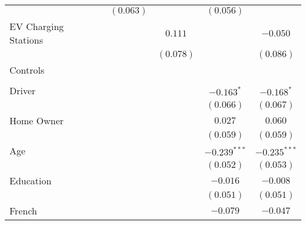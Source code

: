 \begin{center}
\begin{tiny}
\begin{longtable}{l@{} c@{} c@{} c@{} c@{} c@{}}
                                                      &                 & $(0.063)$        &                 & $(0.056)$        &                  \\
\quad EV Charging Stations                            &                 &                  & $0.111$         &                  & $-0.050$         \\
                                                      &                 &                  & $(0.078)$       &                  & $(0.086)$        \\
Controls                                              &                 &                  &                 &                  &                  \\
                                                      &                 &                  &                 &                  &                  \\
\quad Driver                                          &                 &                  &                 & $-0.163^{*}$     & $-0.168^{*}$     \\
                                                      &                 &                  &                 & $(0.066)$        & $(0.067)$        \\
\quad Home Owner                                      &                 &                  &                 & $0.027$          & $0.060$          \\
                                                      &                 &                  &                 & $(0.059)$        & $(0.059)$        \\
\quad Age                                             &                 &                  &                 & $-0.239^{***}$   & $-0.235^{***}$   \\
                                                      &                 &                  &                 & $(0.052)$        & $(0.053)$        \\
\quad Education                                       &                 &                  &                 & $-0.016$         & $-0.008$         \\
                                                      &                 &                  &                 & $(0.051)$        & $(0.051)$        \\
\quad French                                          &                 &                  &                 & $-0.079$         & $-0.047$         \\

\end{longtable}
\end{tiny}
\end{center}

